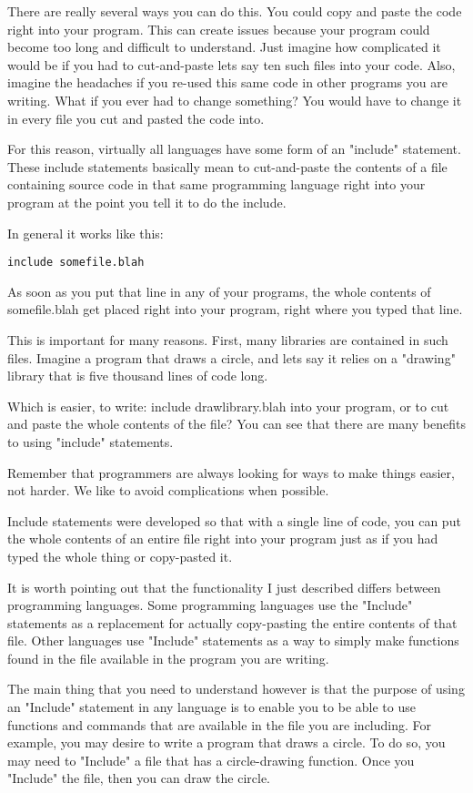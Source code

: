 \documentclass[a4paper,12pt]{article}
\begin{document}
There are really several ways you can do this. You could copy and paste the code right into your program. This can create issues because your program could become too long and difficult to understand. Just imagine how complicated it would be if you had to cut-and-paste lets say ten such files into your code. Also, imagine the headaches if you re-used this same code in other programs you are writing. What if you ever had to change something? You would have to change it in every file you cut and pasted the code into.

For this reason, virtually all languages have some form of an "include" statement. These include statements basically mean to cut-and-paste the contents of a file containing source code in that same programming language right into your program at the point you tell it to do the include.

In general it works like this:
\begin{lstlisting}
include somefile.blah
\end{lstlisting}
As soon as you put that line in any of your programs, the whole contents of somefile.blah get placed right into your program, right where you typed that line.

This is important for many reasons. First, many libraries are contained in such files. Imagine a program that draws a circle, and lets say it relies on a "drawing" library that is five thousand lines of code long.

Which is easier, to write: include drawlibrary.blah into your program, or to cut and paste the whole contents of the file? You can see that there are many benefits to using "include" statements.

Remember that programmers are always looking for ways to make things easier, not harder. We like to avoid complications when possible.

Include statements were developed so that with a single line of code, you can put the whole contents of an entire file right into your program just as if you had typed the whole thing or copy-pasted it.

It is worth pointing out that the functionality I just described differs between programming languages. Some programming languages use the "Include" statements as a replacement for actually copy-pasting the entire contents of that file. Other languages use "Include" statements as a way to simply make functions found in the file available in the program you are writing.

The main thing that you need to understand however is that the purpose of using an "Include" statement in any language is to enable you to be able to use functions and commands that are available in the file you are including. For example, you may desire to write a program that draws a circle. To do so, you may need to "Include" a file that has a circle-drawing function. Once you "Include" the file, then you can draw the circle.
\end{document}
